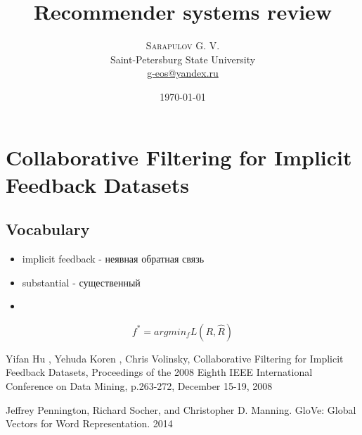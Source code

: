 \documentclass{article}
\title{Recommender systems review} %
\author{%
\textsc{Sarapulov G. V.} \\ %
\normalsize Saint-Petersburg State University \\ %
\normalsize \href{mailto:john@smith.com}{g-eos@yandex.ru} %
}
\date{\today} %
\begin{document}
\maketitle


\section{Collaborative Filtering for Implicit Feedback Datasets}
\subsection{Vocabulary}
\begin{itemize}
\item implicit feedback - неявная обратная связь
\item substantial - существенный
\item 

\end{itemize}

\begin{equation}
\label{eq:foo}
f^* = argmin_f  L(R, \hat R)
\end{equation}






\begin{thebibliography}{99} %

Yifan Hu , Yehuda Koren , Chris Volinsky, Collaborative Filtering for Implicit Feedback Datasets, Proceedings of the 2008 Eighth IEEE International Conference on Data Mining, p.263-272, December 15-19, 2008

Jeffrey Pennington, Richard Socher, and Christopher D. Manning. GloVe: Global Vectors for Word Representation. 2014
\end{thebibliography}

\end{document}
